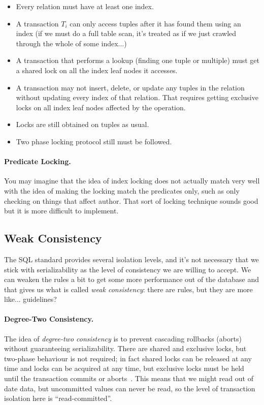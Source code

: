 \begin{itemize}
	\item Every relation must have at least one index.
	\item A transaction $T_{i}$ can only access tuples after it has found them using an index (if we must do a full table scan, it's treated as if we just crawled through the whole of some index...)
	\item A transaction that performs a lookup (finding one tuple or multiple) must get a shared lock on all the index leaf nodes it accesses.
	\item A transaction may not insert, delete, or update any tuples in the relation without updating every index of that relation. That requires getting exclusive locks on all index leaf nodes affected by the operation. 
	\item Locks are still obtained on tuples as usual.
	\item Two phase locking protocol still must be followed. 
\end{itemize}


\paragraph{Predicate Locking.} You may imagine that the idea of index locking does not actually match very well with the idea of making the locking match the predicates only, such as only checking on things that affect author. That sort of locking technique sounds good but it is more difficult to implement. 

\subsection*{Weak Consistency}

The SQL standard provides several isolation levels, and it's not necessary that we stick with serializability as the level of consistency we are willing to accept. We can weaken the rules a bit to get some more performance out of the database and that gives us what is called \textit{weak consistency}: there are rules, but they are more like... guidelines?

\paragraph{Degree-Two Consistency.}
The idea of \textit{degree-two consistency} is to prevent cascading rollbacks (aborts) without guaranteeing serializability. There are shared and exclusive locks, but two-phase behaviour is not required; in fact shared locks can be released at any time and locks can be acquired at any time, but exclusive locks must be held until the transaction commits or aborts~\cite{dsc}. This means that we might read out of date data, but uncommitted values can never be read, so the level of transaction isolation here is ``read-committed''.

